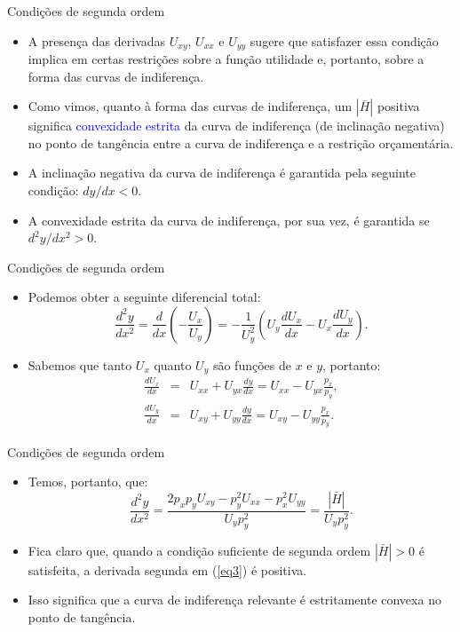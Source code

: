 \documentclass[10pt]{beamer}
\begin{document}
\begin{frame}{Condições de segunda ordem}
\begin{itemize}
    \item A presença das derivadas $U_{xy}$, $U_{xx}$ e $U_{yy}$ sugere que satisfazer essa condição implica em certas restrições sobre a função utilidade e, portanto, sobre a forma das curvas de indiferença.
    \bigskip
    \item Como vimos, quanto à forma das  curvas de indiferença, um $|\bar{H}|$ positiva significa \textcolor{blue}{convexidade estrita} da curva de indiferença (de inclinação negativa) no ponto de tangência entre a curva de indiferença e a restrição orçamentária.
    \bigskip
    \item A inclinação negativa da curva de indiferença é garantida pela seguinte condição: $dy/dx < 0$.
    \bigskip
    \item A convexidade estrita da curva de indiferença, por sua vez, é garantida se $d^2y/dx^2 > 0$.
\end{itemize}
\end{frame}

\begin{frame}{Condições de segunda ordem}
\begin{itemize}
    \item Podemos obter a seguinte diferencial total:
    \begin{equation}
        \frac{d^2y}{dx^2} = \frac{d}{dx}\left( -\frac{U_x}{U_y}\right) = -\frac{1}{U_y^2}\left(U_y\frac{dU_x}{dx} - U_x\frac{dU_y}{dx} \right). \nonumber
    \end{equation}
    \bigskip
    \item Sabemos que tanto $U_x$ quanto $U_y$ são funções de $x$ e $y$, portanto:
    \begin{eqnarray*}
        \frac{dU_x}{dx} &=& U_{xx} + U_{yx}\frac{dy}{dx} = U_{xx} - U_{yx}\frac{p_x}{p_y}, \\ \frac{dU_y}{dx} &=& U_{xy} + U_{yy}\frac{dy}{dx} = U_{xy} - U_{yy}\frac{p_x}{p_y}.
    \end{eqnarray*}
\end{itemize}
\end{frame}

\begin{frame}{Condições de segunda ordem}
\begin{itemize}
    \item Temos, portanto, que:
    \begin{equation}
        \frac{d^2y}{dx^2} = \frac{2p_xp_yU_{xy}-p_y^2U_{xx} - p_x^2U_{yy}}{U_yp_y^2} = \frac{|\bar{H}|}{U_yp_y^2}.
        \label{eq3}
    \end{equation}
    \bigskip
    \item Fica claro que, quando a condição suficiente de segunda ordem $|\bar{H}|>0$ é satisfeita, a derivada segunda em (\ref{eq3}) é positiva.
    \bigskip
    \item Isso significa que a curva de indiferença relevante é estritamente convexa no ponto de tangência.
\end{itemize}
\end{frame}
\end{document}
